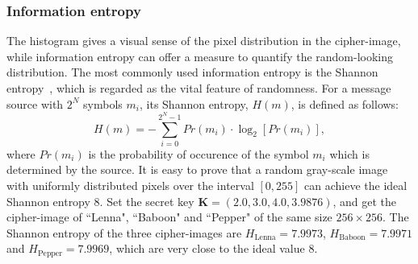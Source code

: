 \documentclass[3p,preprint,11pt]{elsarticle}
\begin{document}
\subsubsection{Information entropy}
The histogram gives a visual sense of the pixel distribution in the cipher-image, while information entropy
can offer a measure to quantify the random-looking distribution. The most commonly used information entropy is
the Shannon entropy~\cite{Shannon:Entropy:BSTJ49}, which is regarded as the vital feature of randomness.
For a message source with $2^N$ symbols $m_i$, its Shannon entropy, $H(m)$, is defined as follows:
\begin{equation*}
H(m) = - \sum_{i=0}^{2^N -1} Pr(m_i) \cdot \log_2[Pr(m_i)],
\end{equation*}
where $Pr(m_i)$ is the probability of occurence of the symbol $m_i$ which is determined by the source. It is easy to prove
that a random gray-scale image with uniformly distributed pixels over the
interval $[0, 255]$ can achieve the ideal Shannon entropy $8$. Set the secret key $\bm{K} = (2.0, 3.0, 4.0, 3.9876)$,
and get the cipher-image of ``Lenna", ``Baboon" and ``Pepper" of the same size $256\times 256$.
The Shannon entropy of the three cipher-images are $H_{\text{Lenna}}=7.9973$, $H_{\text{Baboon}}=7.9971$
and $H_{\text{Pepper}}=7.9969$, which are very close to the ideal value $8$.
\end{document}

